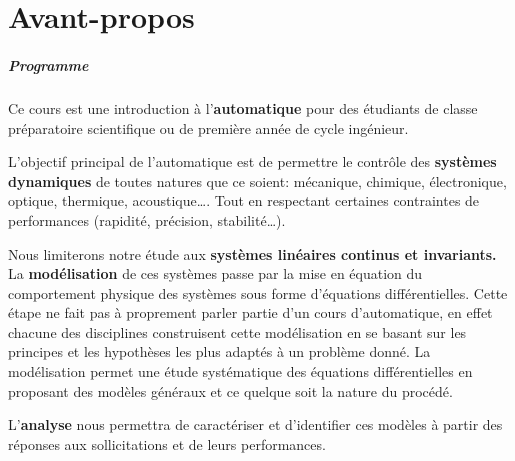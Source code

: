 \chapter*{Avant-propos}
\thispagestyle{plain}
\paragraph{Programme}
Ce cours est une introduction à l'\textbf{automatique}
pour des étudiants de classe préparatoire scientifique ou de première année
de cycle ingénieur.

L'objectif principal de l'automatique est de permettre
le contrôle des \textbf{systèmes dynamiques}
de toutes natures que ce soient: mécanique, chimique, 
électronique, optique, thermique, acoustique\ldots.
Tout en respectant certaines contraintes de performances 
(rapidité, précision, stabilité\ldots).

Nous limiterons notre étude aux \textbf{systèmes linéaires continus et 
invariants.} La \textbf{modélisation} de ces systèmes passe par la mise 
en équation du comportement physique des systèmes sous forme d'équations 
différentielles. Cette étape ne fait pas à proprement parler partie d'un 
cours d'automatique, en effet chacune des disciplines construisent cette 
modélisation en se basant sur les principes et les hypothèses les plus 
adaptés à un problème donné.
La modélisation permet une étude systématique des équations différentielles 
en proposant des modèles généraux et ce quelque soit la nature du procédé.

L'\textbf{analyse} nous permettra de caractériser et d'identifier 
ces modèles à partir des réponses aux sollicitations et de leurs performances.

